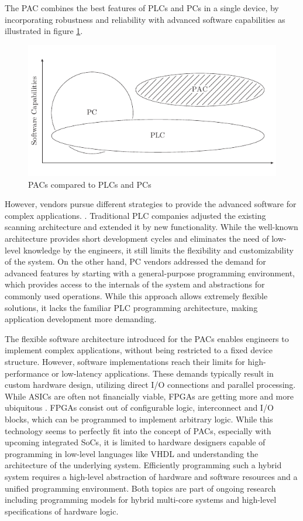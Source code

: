 The \ac{PAC} combines the best features of \acp{PLC} and \acp{PC} in a single
device, by incorporating robustness and reliability with advanced software
capabilities as illustrated in figure \ref{fig:pac}.
\begin{figure}[tb]
	\centering
	\includegraphics{../figures/pac}
	\caption{\acsp{PAC} compared to \acsp{PLC} and \acsp{PC} \citep[adapted from][]{bel05}}
	\label{fig:pac}
\end{figure}
However, vendors pursue different strategies to provide the advanced software
for complex applications. \citep{bel05}. Traditional \ac{PLC} companies
adjusted the existing scanning architecture and extended it by new
functionality. While the well-known architecture provides short development
cycles and eliminates the need of low-level knowledge by the engineers, it
still limits the flexibility and customizability of the system. On the other
hand, \ac{PC} vendors addressed the demand for advanced features by starting
with a general-purpose programming environment, which provides access to the
internals of the system and abstractions for commonly used operations. While
this approach allows extremely flexible solutions, it lacks the familiar
\ac{PLC} programming architecture, making application development more
demanding.

The flexible software architecture introduced for the \acp{PAC} enables
engineers to implement complex applications, without being restricted to a
fixed device structure. However, software implementations reach their limits
for high-performance or low-latency applications. These demands typically
result in custom hardware design, utilizing direct I/O connections and
parallel processing. While \acp{ASIC} are often not financially viable,
\acp{FPGA} are getting more and more ubiquitous \citep{VMB13}. \acp{FPGA}
consist out of configurable logic, interconnect and I/O blocks, which can be
programmed to implement arbitrary logic. While this technology seems to
perfectly fit into the concept of \acp{PAC}, especially with upcoming
integrated \acp{SoC}, it is limited to hardware designers capable of
programming in low-level languages like \ac{VHDL} and understanding the
architecture of the underlying system. Efficiently programming such a hybrid
system requires a high-level abstraction of hardware and software resources
\citep{ANA04} and a unified programming environment. Both topics are part of
ongoing research including programming models for hybrid multi-core systems
and high-level specifications of hardware logic.

